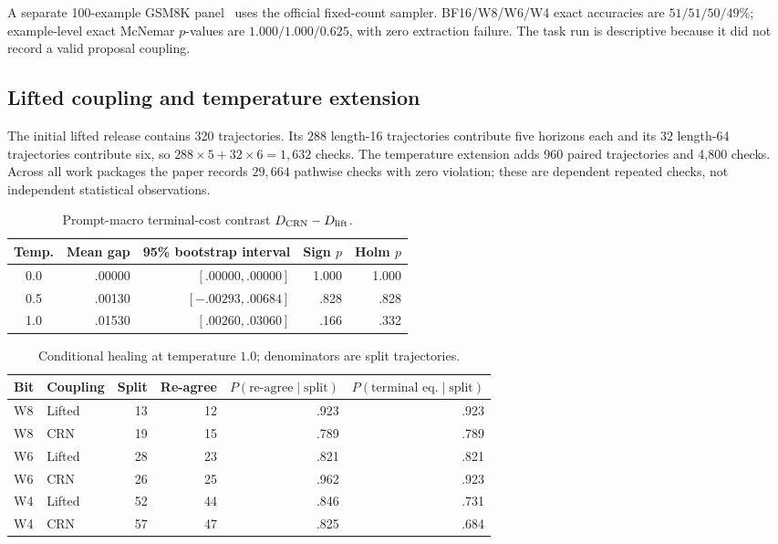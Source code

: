 A separate 100-example GSM8K panel~\citep{cobbe2021gsm8k} uses the official fixed-count sampler. BF16/W8/W6/W4 exact accuracies are $51/51/50/49\%$; example-level exact McNemar $p$-values are $1.000/1.000/0.625$, with zero extraction failure. The task run is descriptive because it did not record a valid proposal coupling.

\subsection{Lifted coupling and temperature extension}
The initial lifted release contains 320 trajectories. Its $288$ length-16 trajectories contribute five horizons each and its $32$ length-64 trajectories contribute six, so $288\times5+32\times6=1{,}632$ checks. The temperature extension adds 960 paired trajectories and 4,800 checks. Across all work packages the paper records $29{,}664$ pathwise checks with zero violation; these are dependent repeated checks, not independent statistical observations.

\begin{table}[ht]
\caption{Prompt-macro terminal-cost contrast $D_{\rm CRN}-D_{\rm lift}$.}
\label{tab:app-temp-macro}
\centering\small
\begin{tabular}{@{}crrrr@{}}
\toprule
Temp. & Mean gap & 95\% bootstrap interval & Sign $p$ & Holm $p$\\
\midrule
0.0 & .00000 & $[.00000,.00000]$ & 1.000 & 1.000\\
0.5 & .00130 & $[-.00293,.00684]$ & .828 & .828\\
1.0 & .01530 & $[.00260,.03060]$ & .166 & .332\\
\bottomrule
\end{tabular}
\end{table}

\begin{table}[ht]
\caption{Conditional healing at temperature $1.0$; denominators are split trajectories.}
\label{tab:app-healing}
\centering\small
\begin{tabular}{@{}llrrrr@{}}
\toprule
Bit & Coupling & Split & Re-agree & $P(\text{re-agree}\mid\text{split})$ & $P(\text{terminal eq.}\mid\text{split})$\\
\midrule
W8 & Lifted & 13 & 12 & .923 & .923\\
W8 & CRN & 19 & 15 & .789 & .789\\
W6 & Lifted & 28 & 23 & .821 & .821\\
W6 & CRN & 26 & 25 & .962 & .923\\
W4 & Lifted & 52 & 44 & .846 & .731\\
W4 & CRN & 57 & 47 & .825 & .684\\
\bottomrule
\end{tabular}
\end{table}

